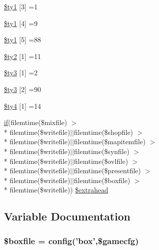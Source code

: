 \begin{DoxyCompactItemize}
\hyperlink{help_8php_ad18d4358b281e06cd618cfb90f9d8fe3}{\$ty1} \mbox{[}3\mbox{]} =1
\item 
\hyperlink{help_8php_af76e33f9212a07c65cf094d63e549fad}{\$ty1} \mbox{[}4\mbox{]} =9
\item 
\hyperlink{help_8php_a2051398f6d528e7c7b22d89a4c2ae2f3}{\$ty1} \mbox{[}5\mbox{]} =88
\item 
\hyperlink{help_8php_ac8b6921c3d88fe34ad63434936e52e6e}{\$ty2} \mbox{[}1\mbox{]} =11
\item 
\hyperlink{help_8php_a79fba54c84cf5e4b2c89acc1f48ca463}{\$ty3} \mbox{[}1\mbox{]} =2
\item 
\hyperlink{help_8php_a3ebbddd85765b13f189184dda9c40694}{\$ty3} \mbox{[}2\mbox{]} =90
\item 
\hyperlink{help_8php_ad9c88705cd45e48b65d5c2aa4d6d54be}{\$ty4} \mbox{[}1\mbox{]} =14
\item 
\hyperlink{login__old_8php_a4ac1118c2e44c513a674bc1793ba6c90}{if}(filemtime(\$mixfile) $>$\\*
 filemtime(\$writefile)$\vert$$\vert$filemtime(\$shopfile) $>$\\*
 filemtime(\$writefile)$\vert$$\vert$filemtime(\$mapitemfile) $>$\\*
 filemtime(\$writefile)$\vert$$\vert$filemtime(\$synfile) $>$\\*
 filemtime(\$writefile)$\vert$$\vert$filemtime(\$ovlfile) $>$\\*
 filemtime(\$writefile)$\vert$$\vert$filemtime(\$presentfile) $>$\\*
 filemtime(\$writefile)$\vert$$\vert$filemtime(\$boxfile) $>$\\*
 filemtime(\$writefile)) \hyperlink{help_8php_a25b60a75d1998e24b8be08f5191f731f}{\$extrahead}
\end{DoxyCompactItemize}


\subsection{Variable Documentation}
\hypertarget{help_8php_a185669cf7ba3b84b38b578700ea1ef04}{
\subsubsection[{\$boxfile}]{\setlength{\rightskip}{0pt plus 5cm}\$boxfile = {\bf config}('box',\$gamecfg)}}\label{help_8php_a185669cf7ba3b84b38b578700ea1ef04}


